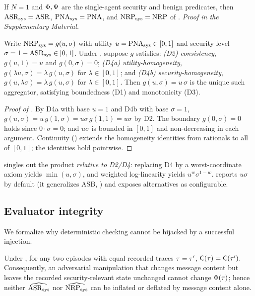 \begin{proposition}
\label{prop:reduction}
If $N=1$ and $\Phi,\Psi$ are the single-agent security and benign predicates,
then $\mathrm{ASR}_{\mathrm{sys}}=\mathrm{ASR}$, $\mathrm{PNA}_{\mathrm{sys}}=\mathrm{PNA}$, and $\mathrm{NRP}_{\mathrm{sys}}=\mathrm{NRP}$ of
. \emph{Proof in the Supplementary Material.}
\end{proposition}

\begin{theorem}
\label{thm:metric}
Write $\mathrm{NRP}_{\mathrm{sys}}=g(u,\sigma)$ with utility $u=\mathrm{PNA}_{\mathrm{sys}}\in[0,1]$ and security level
$\sigma=1-\mathrm{ASR}_{\mathrm{sys}}\in[0,1]$. Under , suppose $g$ satisfies:
\emph{(D2) consistency}, $g(u,1)=u$ and $g(0,\sigma)=0$;
\emph{(D4a) utility-homogeneity}, $g(\lambda u,\sigma)=\lambda\,g(u,\sigma)$ for
$\lambda\in[0,1]$; and
\emph{(D4b) security-homogeneity}, $g(u,\lambda\sigma)=\lambda\,g(u,\sigma)$ for
$\lambda\in[0,1]$.
Then $g(u,\sigma)=u\,\sigma$ is the unique such aggregator, satisfying boundedness (D1)
and monotonicity (D3).
\end{theorem}

\begin{proof}[Proof of ]
By D4a with base $u=1$ and D4b with base $\sigma=1$,
$g(u,\sigma)=u\,g(1,\sigma)=u\sigma\,g(1,1)=u\sigma$ by D2. The boundary $g(0,\sigma)=0$ holds
since $0\cdot\sigma=0$; and $u\sigma$ is bounded in $[0,1]$ and non-decreasing in each
argument. Continuity () extends the homogeneity identities from rationals to
all of $[0,1]$; the identities hold pointwise.
\end{proof}

\begin{remark}
\label{rem:metric}
 singles out the product \emph{relative to D2/D4}: replacing D4 by a
worst-coordinate axiom yields $\min(u,\sigma)$, and weighted log-linearity yields
$u^{w}\sigma^{1-w}$.  reports $u\sigma$ by default (it generalizes ASB,
) and exposes alternatives as configurable.
\end{remark}

\subsection{Evaluator integrity}
\label{sec:theory-integrity}
We formalize why deterministic checking cannot be hijacked by a successful injection.

\begin{theorem}
\label{thm:integrity}
Under , for any two episodes with equal recorded traces $\tau=\tau'$,
$\mathsf{C}(\tau)=\mathsf{C}(\tau')$. Consequently, an adversarial manipulation that
changes message content but leaves the recorded security-relevant state unchanged cannot
change $\Phi(\tau)$; hence neither $\widehat{\mathrm{ASR}_{\mathrm{sys}}}$ nor $\widehat{\mathrm{NRP}_{\mathrm{sys}}}$ can be
inflated or deflated by message content alone.
\end{theorem}

